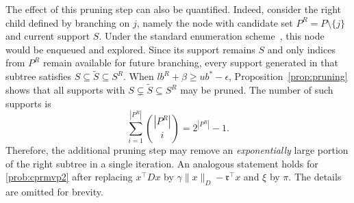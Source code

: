\documentclass[11pt]{article}
\theoremstyle{plain}
\theoremstyle{definition}
\theoremstyle{plain}
\newcommand{\tpose}[1]{#1^{\top}}
\newcommand{\ccr}{{\mathfrak r}}
\begin{document}
The effect of this pruning step can also be quantified. Indeed, consider the right child defined by branching on $j$, namely the node with candidate set $P^R=P\setminus\{j\}$ and current support $S$. Under the standard enumeration scheme~\cite{SenAkkayaPinar2025}, this node would be enqueued and explored. Since its support remains $S$ and only indices from $P^R$ remain available for future branching, every support generated in that subtree satisfies $S\subseteq \tilde S \subseteq S^R$. When $lb^R+\beta\geq ub^*-\epsilon$, Proposition~\ref{prop:pruning} shows that all supports with $S\subsetneq \tilde S \subseteq S^R$ may be pruned. The number of such supports is
\[
    \sum_{i=1}^{|P^R|}\binom{|P^R|}{i}=2^{|P^R|}-1.
\]
Therefore, the additional pruning step may remove an \emph{exponentially} large portion of the right subtree in a single iteration. An analogous statement holds for \eqref{prob:cprmvp2} after replacing $\tpose{x}Dx$ by $\gamma\|x\|_D-\tpose{\ccr}x$ and $\xi$ by $\pi$. The details are omitted for brevity.
\end{document}

